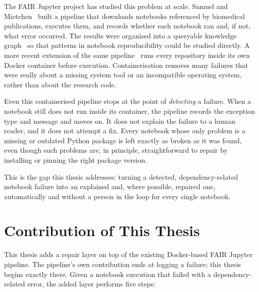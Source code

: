 The FAIR Jupyter project has studied this problem at scale. Samuel and
Mietchen~\cite{samuel2024gigascience} built a pipeline that downloads
notebooks referenced by biomedical publications, executes them, and records
whether each notebook ran and, if not, what error occurred. The results were
organised into a queryable knowledge graph~\cite{samuel2024fairkg} so that
patterns in notebook reproducibility could be studied directly. A more recent
extension of the same pipeline~\cite{samuel2025docker} runs every repository
inside its own Docker container before execution. Containerisation removes
many failures that were really about a missing system tool or an
incompatible operating system, rather than about the research code.

Even this containerised pipeline stops at the point of \emph{detecting} a
failure. When a notebook still does not run inside its container, the
pipeline records the exception type and message and moves on. It does not
explain the failure to a human reader, and it does not attempt a fix. Every
notebook whose only problem is a missing or outdated Python package is left
exactly as broken as it was found, even though such problems are, in
principle, straightforward to repair by installing or pinning the right
package version.

This is the gap this thesis addresses: turning a detected, dependency-related
notebook failure into an explained and, where possible, repaired one,
automatically and without a person in the loop for every single notebook.

\section{Contribution of This Thesis}
\label{sec:intro-contribution}

This thesis adds a repair layer on top of the existing Docker-based FAIR
Jupyter pipeline. The pipeline's own contribution ends at logging a failure;
this thesis begins exactly there. Given a notebook execution that failed with
a dependency-related error, the added layer performs five steps:

